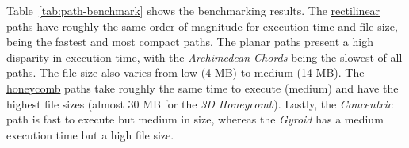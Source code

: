Table~\ref{tab:path-benchmark} shows the benchmarking results. The
\underline{rectilinear} paths have roughly the same order of magnitude for
execution time and file size, being the fastest and most compact paths.
The \underline{planar} paths present a high disparity in execution time, with
the \emph{Archimedean Chords} being the slowest of all paths. The file size also
varies from low (4 MB) to medium (14 MB).
The \underline{honeycomb} paths take roughly the same time to execute (medium)
and have the highest file sizes (almost 30 MB for the \emph{3D Honeycomb}).
Lastly, the \emph{Concentric} path is fast to execute but medium in size,
whereas the \emph{Gyroid} has a medium execution time but a high file size.

\begin{table}[!hbt]
\centering
\caption{Path benchmarking in terms of computational resources}%
\label{tab:path-benchmark}
\end{table}

